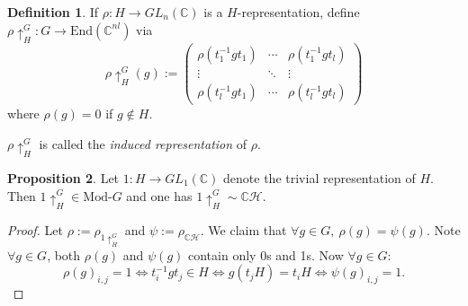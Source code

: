 \documentclass[a4paper]{article}
\newcommand{\cH}{\mathcal{H}}
\newcommand{\C}{\mathbb{C}}
\newcommand{\End}{\text{End}}
\newcommand{\Mod}{\text{Mod-}}
\theoremstyle{definition}
\newtheorem{defn}{Definition}[subsection]
\newtheorem{prop}[defn]{Proposition}
\begin{document}
\begin{defn}
If $\rho:H\rightarrow GL_n(\C)$ is a $H$-representation, define $\rho\uparrow_H^G:G\rightarrow \End(\C^{nl})$ via
\[
\rho\uparrow_H^G(g):=\begin{pmatrix}
\rho(t_1^{-1}gt_1) & \cdots & \rho(t_1^{-1}gt_l) \\
\vdots & \ddots & \vdots \\
\rho(t_l^{-1}gt_1) & \cdots & \rho(t_l^{-1}gt_l)
\end{pmatrix}
\]
where $\rho(g)=0$ if $g\notin H$.

$\rho\uparrow_H^G$ is called the \textit{induced representation} of $\rho$.
\end{defn}

\begin{prop}
\label{prop:trivinduced}
Let $1:H\rightarrow GL_1(\C)$ denote the trivial representation of $H$. Then $1\uparrow_H^G\in\Mod G$ and one has $1\uparrow_H^G\sim\C\cH$.
\end{prop}
\begin{proof}
Let $\rho:=\rho_{1\uparrow_H^G}$ and $\psi:=\rho_{\C\cH}$. We claim that $\forall g\in G,\ \rho(g)=\psi(g)$. Note $\forall g\in G$, both $\rho(g)$ and $\psi(g)$ contain only 0s and 1s. Now $\forall g\in G$:
\[
\rho(g)_{i,j}=1\iff t_i^{-1}gt_j\in H\iff g(t_jH)=t_iH\iff \psi(g)_{i,j}=1.
\]
\end{proof}
\end{document}
